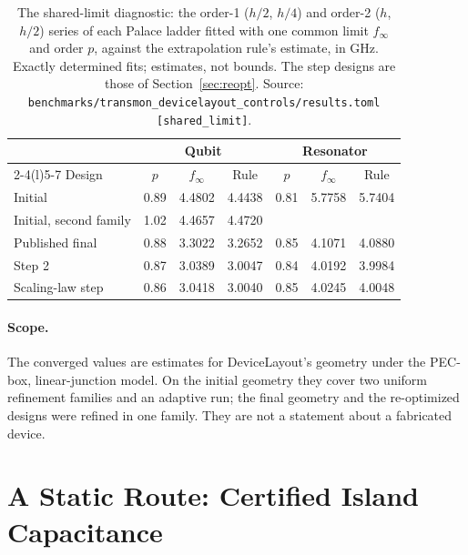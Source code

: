 \documentclass{anvil-paper}
\begin{document}
\begin{table}[htbp]
  \centering
  \caption{The shared-limit diagnostic: the order-1 ($h/2$, $h/4$) and
  order-2 ($h$, $h/2$) series of each Palace ladder fitted with one common
  limit $f_\infty$ and order $p$, against the extrapolation rule's
  estimate, in GHz. Exactly determined fits; estimates, not bounds. The
  step designs are those of Section~\ref{sec:reopt}. Source:
  \texttt{benchmarks/transmon\_devicelayout\_controls/results.toml}
  \texttt{[shared\_limit]}.}
  \label{tab:shared}
  \small
  \begin{tabular}{@{}lcccccc@{}}
    \toprule
    & \multicolumn{3}{c}{Qubit} & \multicolumn{3}{c}{Resonator} \\
    \cmidrule(lr){2-4}\cmidrule(l){5-7}
    Design & $p$ & $f_\infty$ & Rule & $p$ & $f_\infty$ & Rule \\
    \midrule
    Initial & 0.89 & 4.4802 & 4.4438 & 0.81 & 5.7758 & 5.7404 \\
    Initial, second family & 1.02 & 4.4657 & 4.4720 & & & \\
    Published final & 0.88 & 3.3022 & 3.2652 & 0.85 & 4.1071 & 4.0880 \\
    Step 2 & 0.87 & 3.0389 & 3.0047 & 0.84 & 4.0192 & 3.9984 \\
    Scaling-law step & 0.86 & 3.0418 & 3.0040 & 0.85 & 4.0245 & 4.0048 \\
    \bottomrule
  \end{tabular}
\end{table}

\paragraph{Scope.}
The converged values are estimates for DeviceLayout's geometry under the
PEC-box, linear-junction model. On the initial geometry they cover two
uniform refinement families and an adaptive run; the final geometry and
the re-optimized designs were refined in one family. They are not a
statement about a fabricated device.

\section{A Static Route: Certified Island Capacitance}
\label{sec:static}
\end{document}
